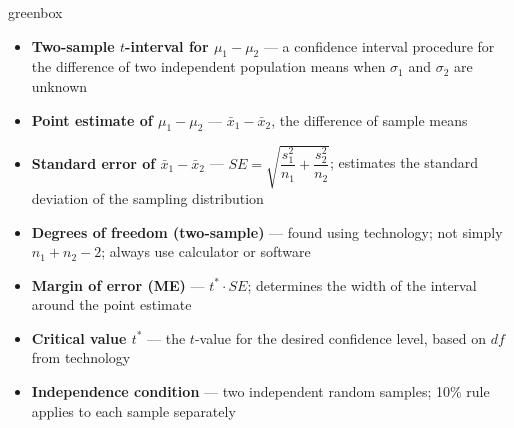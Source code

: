 \documentclass[10pt]{article}
\begin{document}
\begin{skillbox}{greenbox}
\begin{minipage}[t]{0.48\linewidth}
    \begin{itemize}
        \item \textbf{Two-sample $t$-interval for $\mu_1 - \mu_2$} --- a confidence
              interval procedure for the difference of two independent population means
              when $\sigma_1$ and $\sigma_2$ are unknown
        \item \textbf{Point estimate of $\mu_1 - \mu_2$} --- $\bar x_1 - \bar x_2$,
              the difference of sample means
        \item \textbf{Standard error of $\bar x_1 - \bar x_2$} ---
              $SE = \sqrt{\dfrac{s_1^2}{n_1} + \dfrac{s_2^2}{n_2}}$;
              estimates the standard deviation of the sampling distribution
    \end{itemize}
\end{minipage}
\hfill
\begin{minipage}[t]{0.48\linewidth}
    \begin{itemize}
        \item \textbf{Degrees of freedom (two-sample)} --- found using technology;
              not simply $n_1 + n_2 - 2$; always use calculator or software
        \item \textbf{Margin of error (ME)} --- $t^* \cdot SE$; determines the width
              of the interval around the point estimate
        \item \textbf{Critical value $t^*$} --- the $t$-value for the desired confidence
              level, based on $df$ from technology
        \item \textbf{Independence condition} --- two independent random samples; 10\%
              rule applies to each sample separately
    \end{itemize}
\end{minipage}
\end{skillbox}
\end{document}
